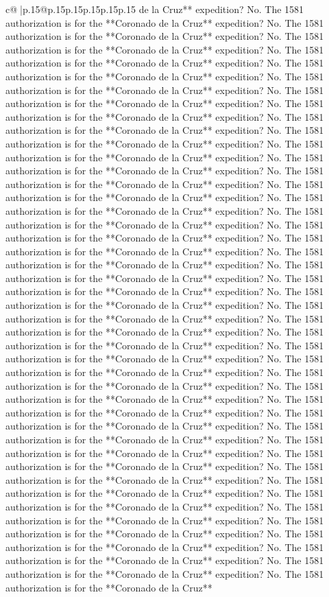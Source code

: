 \documentclass{article}
\begin{document}
{\begin{supertabular}{c@{$\;$}|p{.15\linewidth}@{}p{.15\linewidth}p{.15\linewidth}p{.15\linewidth}p{.15\linewidth}p{.15\linewidth}}
{{{de la Cruz** expedition? No. The 1581 authorization is for the **Coronado de la Cruz** expedition? No. The 1581 authorization is for the **Coronado de la Cruz** expedition? No. The 1581 authorization is for the **Coronado de la Cruz** expedition? No. The 1581 authorization is for the **Coronado de la Cruz** expedition? No. The 1581 authorization is for the **Coronado de la Cruz** expedition? No. The 1581 authorization is for the **Coronado de la Cruz** expedition? No. The 1581 authorization is for the **Coronado de la Cruz** expedition? No. The 1581 authorization is for the **Coronado de la Cruz** expedition? No. The 1581 authorization is for the **Coronado de la Cruz** expedition? No. The 1581 authorization is for the **Coronado de la Cruz** expedition? No. The 1581 authorization is for the **Coronado de la Cruz** expedition? No. The 1581 authorization is for the **Coronado de la Cruz** expedition? No. The 1581 authorization is for the **Coronado de la Cruz** expedition? No. The 1581 authorization is for the **Coronado de la Cruz** expedition? No. The 1581 authorization is for the **Coronado de la Cruz** expedition? No. The 1581 authorization is for the **Coronado de la Cruz** expedition? No. The 1581 authorization is for the **Coronado de la Cruz** expedition? No. The 1581 authorization is for the **Coronado de la Cruz** expedition? No. The 1581 authorization is for the **Coronado de la Cruz** expedition? No. The 1581 authorization is for the **Coronado de la Cruz** expedition? No. The 1581 authorization is for the **Coronado de la Cruz** expedition? No. The 1581 authorization is for the **Coronado de la Cruz** expedition? No. The 1581 authorization is for the **Coronado de la Cruz** expedition? No. The 1581 authorization is for the **Coronado de la Cruz** expedition? No. The 1581 authorization is for the **Coronado de la Cruz** expedition? No. The 1581 authorization is for the **Coronado de la Cruz** expedition? No. The 1581 authorization is for the **Coronado de la Cruz** expedition? No. The 1581 authorization is for the **Coronado de la Cruz** expedition? No. The 1581 authorization is for the **Coronado de la Cruz** expedition? No. The 1581 authorization is for the **Coronado de la Cruz** expedition? No. The 1581 authorization is for the **Coronado de la Cruz** expedition? No. The 1581 authorization is for the **Coronado de la Cruz** expedition? No. The 1581 authorization is for the **Coronado de la Cruz** expedition? No. The 1581 authorization is for the **Coronado de la Cruz** expedition? No. The 1581 authorization is for the **Coronado de la Cruz** expedition? No. The 1581 authorization is for the **Coronado de la Cruz** expedition? No. The 1581 authorization is for the **Coronado de la Cruz** expedition? No. The 1581 authorization is for the **Coronado de la Cruz** expedition? No. The 1581 authorization is for the **Coronado de la Cruz** expedition? No. The 1581 authorization is for the **Coronado de la Cruz** expedition? No. The 1581 authorization is for the **Coronado de la Cruz** expedition? No. The 1581 authorization is for the **Coronado de la Cruz** expedition? No. The 1581 authorization is for the **Coronado de la Cruz** }}}
\end{supertabular}}
\end{document}

